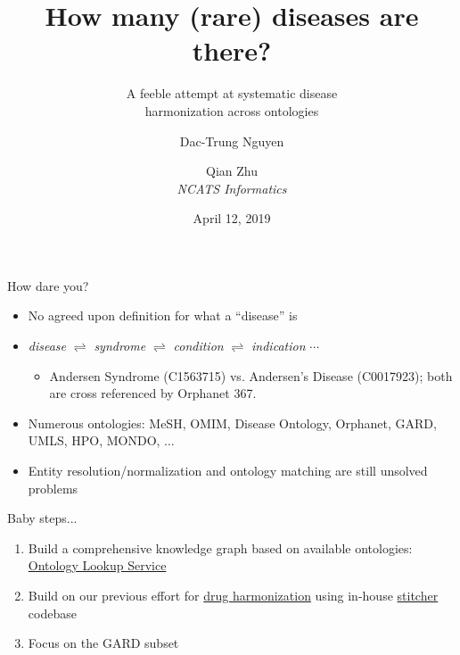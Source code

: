 ﻿\documentclass[anchorcolor=blue,linkcolor=blue]{beamer}
\title{How many (rare) diseases are there?}
\subtitle{A feeble attempt at systematic disease\\
  harmonization across ontologies}
\author{Dac-Trung Nguyen\and Qian Zhu\\[1em] \emph{NCATS Informatics}}
\date{April 12, 2019}
\begin{document}
\begin{frame}
  \titlepage
\end{frame}

\begin{frame}
  \begin{block}{How dare you?}
    \begin{itemize}
    \item No agreed upon definition for what a ``disease'' is
    \item \emph{disease} $\rightleftharpoons$ \emph{syndrome}
      $\rightleftharpoons$ \emph{condition} $\rightleftharpoons$
      \emph{indication} $\cdots$
      \begin{itemize}
        \item Andersen Syndrome (C1563715) vs. Andersen's Disease (C0017923); both are cross referenced by Orphanet 367.
      \end{itemize}
    \item Numerous ontologies: MeSH, OMIM, Disease Ontology, Orphanet,
      GARD, UMLS, HPO, MONDO, $\ldots$
    \item Entity resolution/normalization and ontology matching are
      still unsolved problems
    \end{itemize}
  \end{block}
  \begin{block}{Baby steps...}
    \begin{enumerate}
      \item Build a comprehensive knowledge graph based on available
        ontologies: \href{https://www.ebi.ac.uk/ols/ontologies}{Ontology
          Lookup Service}
      \item Build on our previous effort for
        \href{https://stitcher.ncats.io/app/stitches/latest}{drug harmonization} using
        in-house
        \href{https://spotlite.nih.gov/ncats/stitcher.git}{stitcher} codebase
      \item Focus on the GARD subset
    \end{enumerate}
  \end{block}
\end{frame}
\end{document}
